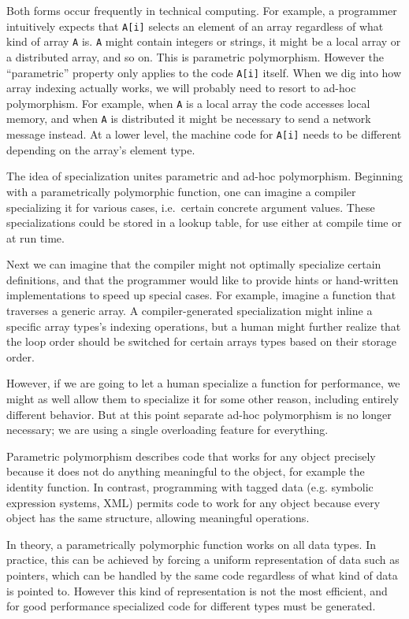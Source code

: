 Both forms occur frequently in technical computing.
For example, a programmer intuitively expects that \texttt{A[i]} selects
an element of an array regardless of what kind of array \texttt{A} is.
\texttt{A} might contain integers or strings, it might be a local
array or a distributed array, and so on.
This is parametric polymorphism.
However the ``parametric'' property only applies to the code \texttt{A[i]}
itself.
When we dig into how array indexing actually works, we will probably
need to resort to ad-hoc polymorphism.
For example, when \texttt{A} is a local array the code accesses local
memory, and when \texttt{A} is distributed it might be necessary to
send a network message instead.
At a lower level, the machine code for \texttt{A[i]} needs to be
different depending on the array's element type.

The idea of specialization unites parametric and ad-hoc polymorphism.
Beginning with a parametrically polymorphic function, one can imagine
a compiler specializing it for various cases, i.e.\ certain concrete argument
values. These specializations could be stored in a lookup table, for use
either at compile time or at run time.

Next we can imagine that the compiler might not optimally specialize
certain definitions, and that the programmer would like to provide
hints or hand-written implementations to speed up special cases.
For example, imagine a function that traverses a generic array. A compiler-generated
specialization might inline a specific array types's indexing operations, but a human
might further realize that the loop order should be switched for certain
arrays types based on their storage order.

However, if we are going to let a human specialize a function for performance,
we might as well allow them to specialize it for some other reason, including
entirely different behavior. But at this point separate ad-hoc polymorphism
is no longer necessary; we are using a single overloading feature for
everything.


Parametric polymorphism describes code that works for any object precisely
because it does not do anything meaningful to the object, for example the
identity function. In contrast, programming with tagged data (e.g.
symbolic expression systems, XML) permits code to work for any object
because every object has the same structure, allowing meaningful
operations.

In theory, a parametrically polymorphic function works on all data
types.
In practice, this can be achieved by forcing a uniform representation of
data such as pointers, which can be handled by the same code regardless of
what kind of data is pointed to.
However this kind of representation is not the most efficient, and
for good performance specialized code for different types must be
generated.

